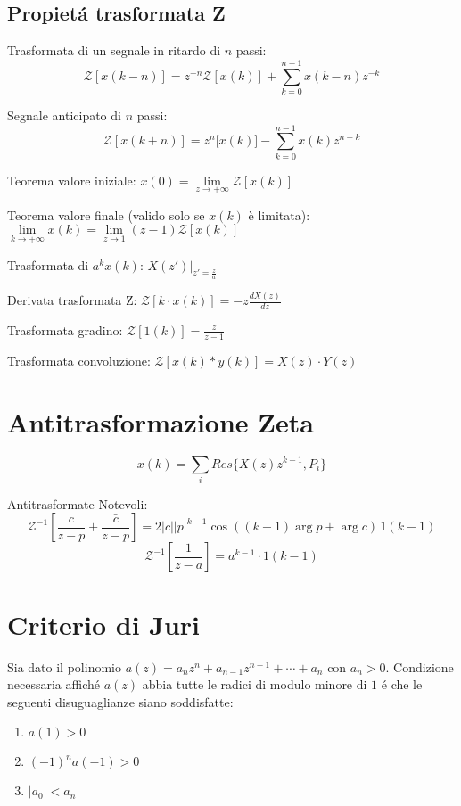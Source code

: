 \documentclass{article}
\begin{document}
\subsection{Propiet\'a trasformata Z}
Trasformata di un segnale in ritardo di $n$ passi:
\[ \mathcal{Z}[x(k-n)] = z^{-n}\mathcal{Z}[x(k)] + \sum\limits_{k=0}^{n-1} x(k-n) z^{-k} \]

Segnale anticipato di $n$ passi:
\[ \mathcal{Z}[x(k+n)] = z^n\mathcal[x(k)] - \sum\limits_{k=0}^{n-1}x(k)z^{n-k} \]

Teorema valore iniziale: $x(0) = \lim\limits_{z\to +\infty} \mathcal{Z}[x(k)] $

Teorema valore finale (valido solo se $x(k)$ \`e limitata):
$\lim\limits_{k\to +\infty} x(k) = \lim\limits_{z \to 1} (z-1) \mathcal{Z}[x(k)] $

Trasformata di $a^kx(k)$: $X(z')\Big|_{z'=\frac{z}{a}}$

Derivata trasformata Z: $\mathcal{Z}[k\cdot x(k)] = -z \frac{dX(z)}{dz}$

Trasformata gradino: $\mathcal{Z}[1(k)] = \frac{z}{z-1} $

Trasformata convoluzione: $\mathcal{Z}[x(k) \ast y(k)] = X(z)\cdot Y(z)$

\section {Antitrasformazione Zeta}
\[ x(k) = \sum\limits_i Res\{ X(z) z^{k-1}, P_i \} \]

Antitrasformate Notevoli:
\[ \mathcal{Z}^{-1}\left[ \frac{c}{z-p} + \frac{\bar c}{z-p} \right] = 2|c||p|^{k-1} \cos((k-1) \arg p + \arg c )\, 1(k-1) \]
\[ \mathcal{Z}^{-1}\left[ \frac{1}{z-a}\right] = a^{k-1} \cdot 1(k-1) \]

\section{Criterio di Juri}
Sia dato il polinomio $a(z) = a_n z^n + a_{n-1} z^{n-1} + \cdots + a_n$ con $a_n > 0$. Condizione necessaria affich\'e $a(z)$ abbia tutte le radici di modulo minore di $1$ \'e che le seguenti disuguaglianze siano soddisfatte:

\begin{enumerate}
    \item $a(1) > 0$
    \item $(-1)^n a(-1) > 0$
    \item $|a_0| < a_n$
\end{enumerate}
\end{document}
